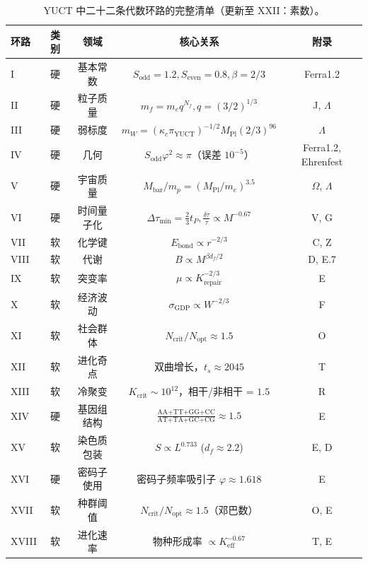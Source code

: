 \documentclass[12pt,a4paper]{article}
\begin{document}
	\begin{table}[htbp]
		\centering
		\caption{YUCT 中二十二条代数环路的完整清单（更新至 XXII：素数）。}
		\label{tab:all-loops-22}
		\footnotesize
		\begin{tabular}{l c c c c}
			\toprule
			\textbf{环路} & \textbf{类别} & \textbf{领域} & \textbf{核心关系} & \textbf{附录} \\
			\midrule
			I   & 硬 & 基本常数 & \(S_{\mathrm{odd}}=1.2, S_{\mathrm{even}}=0.8, \beta=2/3\) & Ferra1.2 \\
			II  & 硬 & 粒子质量 & \(m_f = m_e q^{N_f}, q=(3/2)^{1/3}\) & J, \(\Lambda\) \\
			III & 硬 & 弱标度 & \(m_W = (\kappa_c \pi_{\mathrm{YUCT}})^{-1/2} M_{\mathrm{Pl}} (2/3)^{96}\) & \(\Lambda\) \\
			IV  & 硬 & 几何 & \(S_{\mathrm{odd}}\varphi^2 \approx \pi\)（误差 \(10^{-5}\)） & Ferra1.2, Ehrenfest \\
			V   & 硬 & 宇宙质量 & \(M_{\mathrm{bar}}/m_p = (M_{\mathrm{Pl}}/m_e)^{3.5}\) & \(\Omega\), \(\Lambda\) \\
			VI  & 硬 & 时间量子化 & \(\Delta\tau_{\min} = \frac{2}{3}t_P, \frac{\delta\tau}{\tau} \propto M^{-0.67}\) & V, G \\
			VII & 软 & 化学键 & \(E_{\mathrm{bond}} \propto r^{-2/3}\) & C, Z \\
			VIII& 软 & 代谢 & \(B \propto M^{\beta d_f/2}\) & D, E.7 \\
			IX  & 软 & 突变率 & \(\mu \propto K_{\mathrm{repair}}^{-2/3}\) & E \\
			X   & 软 & 经济波动 & \(\sigma_{\mathrm{GDP}} \propto W^{-2/3}\) & F \\
			XI  & 软 & 社会群体 & \(N_{\mathrm{crit}}/N_{\mathrm{opt}} \approx 1.5\) & O \\
			XII & 软 & 进化奇点 & 双曲增长，\(t_s \approx 2045\) & T \\
			XIII& 软 & 冷聚变 & \(K_{\mathrm{crit}} \sim 10^{12}\)，相干/非相干 = \(1.5\) & R \\
			XIV & 硬 & 基因组结构 & \(\frac{\text{AA+TT+GG+CC}}{\text{AT+TA+GC+CG}} \approx 1.5\) & E \\
			XV  & 软 & 染色质包装 & \(S \propto L^{0.733}\) (\(d_f \approx 2.2\)) & E, D \\
			XVI & 硬 & 密码子使用 & 密码子频率吸引子 \(\varphi \approx 1.618\) & E \\
			XVII& 软 & 种群阈值 & \(N_{\mathrm{crit}}/N_{\mathrm{opt}} \approx 1.5\)（邓巴数） & O, E \\
			XVIII&软 & 进化速率 & 物种形成率 \(\propto K_{\mathrm{eff}}^{-0.67}\) & T, E \\

\end{tabular}
\end{table}
\end{document}
